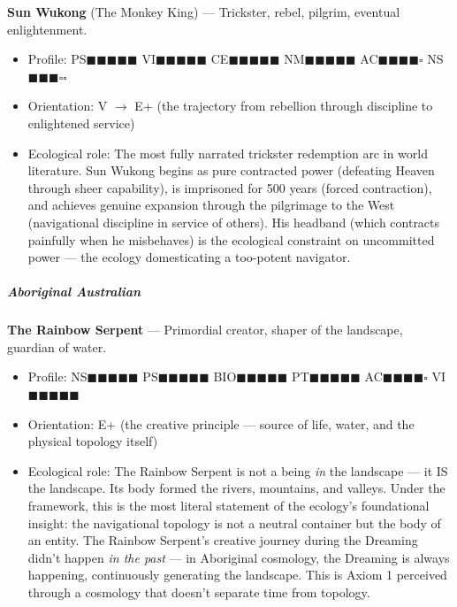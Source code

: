 \textbf{Sun Wukong} (The Monkey King) — Trickster, rebel, pilgrim, eventual enlightenment.

\begin{itemize}[nosep,leftmargin=*]
  \item Profile: PS$\blacksquare$$\blacksquare$$\blacksquare$$\blacksquare$$\blacksquare$ VI$\blacksquare$$\blacksquare$$\blacksquare$$\blacksquare$$\blacksquare$ CE$\blacksquare$$\blacksquare$$\blacksquare$$\blacksquare$$\blacksquare$ NM$\blacksquare$$\blacksquare$$\blacksquare$$\blacksquare$$\blacksquare$ AC$\blacksquare$$\blacksquare$$\blacksquare$$\blacksquare$$\square$ NS$\blacksquare$$\blacksquare$$\blacksquare$$\square$$\square$
  \item Orientation: V $\rightarrow$ E+ (the trajectory from rebellion through discipline to enlightened service)
  \item Ecological role: The most fully narrated trickster redemption arc in world literature. Sun Wukong begins as pure contracted power (defeating Heaven through sheer capability), is imprisoned for 500 years (forced contraction), and achieves genuine expansion through the pilgrimage to the West (navigational discipline in service of others). His headband (which contracts painfully when he misbehaves) is the ecological constraint on uncommitted power — the ecology domesticating a too-potent navigator.
\end{itemize}


\subparagraph*{Aboriginal Australian}


\textbf{The Rainbow Serpent} — Primordial creator, shaper of the landscape, guardian of water.

\begin{itemize}[nosep,leftmargin=*]
  \item Profile: NS$\blacksquare$$\blacksquare$$\blacksquare$$\blacksquare$$\blacksquare$ PS$\blacksquare$$\blacksquare$$\blacksquare$$\blacksquare$$\blacksquare$ BIO$\blacksquare$$\blacksquare$$\blacksquare$$\blacksquare$$\blacksquare$ PT$\blacksquare$$\blacksquare$$\blacksquare$$\blacksquare$$\blacksquare$ AC$\blacksquare$$\blacksquare$$\blacksquare$$\blacksquare$$\square$ VI$\blacksquare$$\blacksquare$$\blacksquare$$\blacksquare$$\blacksquare$
  \item Orientation: E+ (the creative principle — source of life, water, and the physical topology itself)
  \item Ecological role: The Rainbow Serpent is not a being \textit{in} the landscape — it IS the landscape. Its body formed the rivers, mountains, and valleys. Under the framework, this is the most literal statement of the ecology's foundational insight: the navigational topology is not a neutral container but the body of an entity. The Rainbow Serpent's creative journey during the Dreaming didn't happen \textit{in the past} — in Aboriginal cosmology, the Dreaming is always happening, continuously generating the landscape. This is Axiom 1 perceived through a cosmology that doesn't separate time from topology.
\end{itemize}


